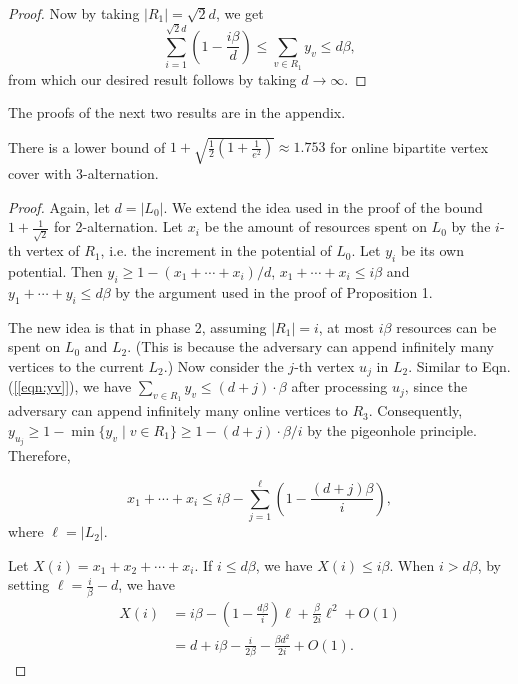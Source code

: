 \documentclass{article}
\begin{document}
\begin{proof}
Now by taking $|R_1|=\sqrt{2}d$, we get$$\sum_{i=1}^{\sqrt{2}d}\left( 1-\frac{i\beta}{d}\right) \leq\sum_{v\in R_1} y_v\leq d\beta ,$$
from which our desired result follows by taking $d\longrightarrow\infty$.
\end{proof}

The proofs of the next two results are in the appendix.
\begin{proposition}
There is a lower bound of $1+\sqrt{\frac{1}{2}\left(1+\frac{1}{e^2}\right)}\approx1.753$
for online bipartite vertex cover with 3-alternation.
\end{proposition}
\begin{proof}
Again, let $d=|L_{0}|$. We extend the idea used in the proof of the
bound $1+\frac{1}{\sqrt{2}}$ for 2-alternation. Let $x_{i}$ be the
amount of resources spent on $L_{0}$ by the $i$-th vertex of $R_{1}$, i.e. the increment in the potential of $L_0$.
Let $y_{i}$ be its own potential. Then $y_{i}\geq 1-(x_{1}+\cdots+x_{i})/d$,
$x_{1}+\cdots+x_{i}\leq i\beta$ and $y_{1}+\cdots+y_{i}\leq d\beta$ by the argument used in the proof of Proposition 1.

The new idea is that in phase 2, assuming $|R_1| =i$,  at most $i\beta$ resources can be spent
on $L_{0}$ and $L_{2}$. (This is because the adversary can append infinitely many vertices to the current $L_2$.) Now consider the $j$-th vertex $u_j$ in $L_2$. Similar to Eqn.(\ref{[eqn:yv]}), 
we have $\sum_{v\in R_1} y_v \leq (d+j)\cdot \beta$ after processing $u_j$, since the adversary can append infinitely many online vertices to $R_3$. Consequently, $y_{u_j} \geq 1- \min\{y_v \mid v\in R_1 \} \geq 1- (d+j)\cdot \beta/i$ by the pigeonhole principle. Therefore,

\[
x_{1}+\cdots+x_{i}\leq i\beta-\sum_{j=1}^{\ell}\left(1-\frac{(d+j)\beta}{i}\right),
\]
where $\ell = |L_2|$.


Let $X(i)=x_1+x_2+\cdots+x_i$.
If $i \le d\beta$, we have $X(i) \leq i\beta$. When $i>d\beta$, by setting $\ell = \frac{i}{\beta} - d$, we have 
\begin{align}
X(i) &= i\beta - \left(1-\frac{d\beta}{i}\right)\ell+\frac{\beta}{2i}\ell^2+O(1) \nonumber\\
&= d+i\beta-\frac{i}{2\beta}-\frac{\beta d^2}{2i}+O(1).\nonumber
\label{eqn:Xi}
\end{align}


\end{proof}
\end{document}

